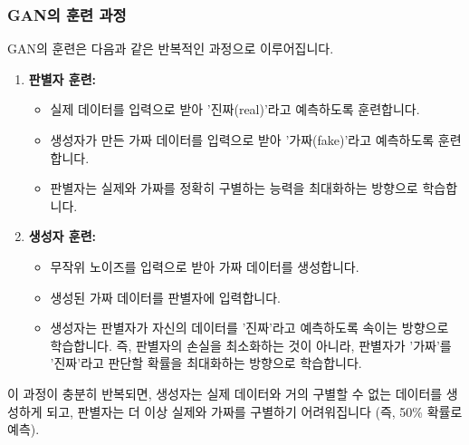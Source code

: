 \documentclass[11pt,a4paper]{article}
\theoremstyle{definition}
\begin{document}
\subsubsection{GAN의 훈련 과정}
GAN의 훈련은 다음과 같은 반복적인 과정으로 이루어집니다.
\begin{enumerate}
    \item \textbf{판별자 훈련:}
    \begin{itemize}
        \item 실제 데이터를 입력으로 받아 '진짜(real)'라고 예측하도록 훈련합니다.
        \item 생성자가 만든 가짜 데이터를 입력으로 받아 '가짜(fake)'라고 예측하도록 훈련합니다.
        \item 판별자는 실제와 가짜를 정확히 구별하는 능력을 최대화하는 방향으로 학습합니다.
    \end{itemize}
    \item \textbf{생성자 훈련:}
    \begin{itemize}
        \item 무작위 노이즈를 입력으로 받아 가짜 데이터를 생성합니다.
        \item 생성된 가짜 데이터를 판별자에 입력합니다.
        \item 생성자는 판별자가 자신의 데이터를 '진짜'라고 예측하도록 속이는 방향으로 학습합니다. 즉, 판별자의 손실을 최소화하는 것이 아니라, 판별자가 '가짜'를 '진짜'라고 판단할 확률을 최대화하는 방향으로 학습합니다.
    \end{itemize}
\end{enumerate}
이 과정이 충분히 반복되면, 생성자는 실제 데이터와 거의 구별할 수 없는 데이터를 생성하게 되고, 판별자는 더 이상 실제와 가짜를 구별하기 어려워집니다 (즉, 50\% 확률로 예측).
\end{document}
